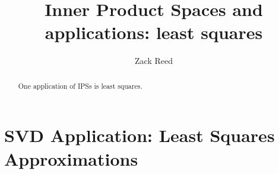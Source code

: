 \documentclass{ximera}
\author{Zack Reed}
\title{Inner Product Spaces and applications: least squares}
\begin{document}
\begin{abstract}

    One application of IPSs is least squares.

\end{abstract}
\maketitle


\section{SVD Application: Least Squares Approximations}
\label{sec:least-squares}

\end{document}
